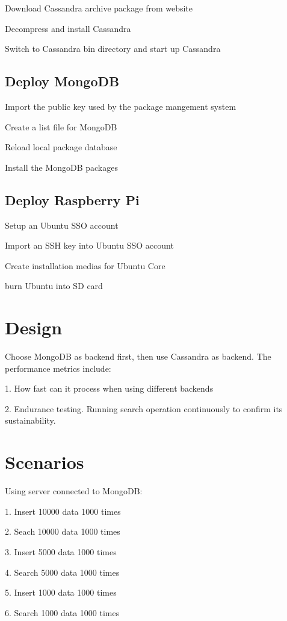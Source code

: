 Download Cassandra archive package from website

Decompress and install Cassandra 

Switch to Cassandra bin directory and start up Cassandra

\subsection{Deploy MongoDB }

Import the public key used by the package mangement  system

Create a list file for MongoDB

Reload local package database

Install the MongoDB packages

\subsection{Deploy Raspberry Pi}

Setup an Ubuntu SSO account

Import an SSH key into Ubuntu SSO account

Create installation medias for Ubuntu Core 

burn Ubuntu into SD card

\section{Design}
Choose MongoDB as backend first, then use Cassandra as backend. 
The performance metrics include: 

1. How fast can it process when using different backends

2. Endurance testing. Running search operation continuously to confirm its 
sustainability.

\section{Scenarios}

Using server connected to MongoDB:

1. Insert 10000 data 1000 times

2. Seach 10000 data 1000 times

3. Insert 5000 data 1000 times

4. Search 5000 data 1000 times

5. Insert 1000 data 1000 times

6. Search 1000 data 1000 times

